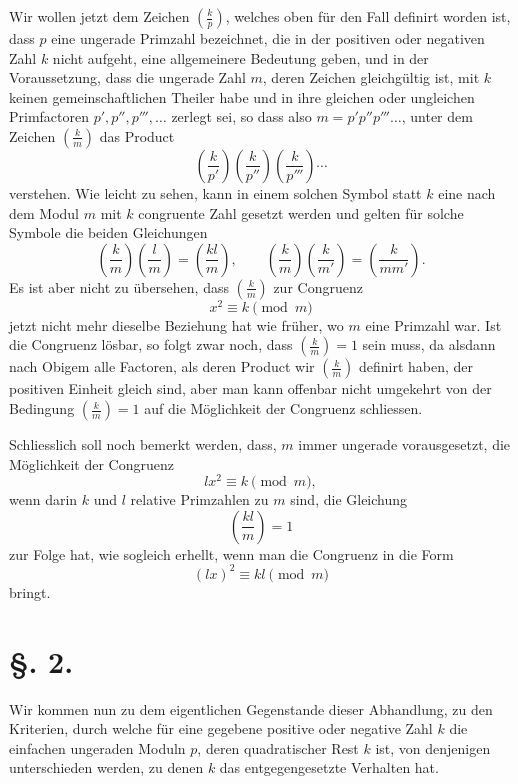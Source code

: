 \documentclass[11pt]{article}
\newcommand{\J}[2]{\left(\frac{#1}{#2}\right)}
\begin{document}
Wir wollen jetzt dem Zeichen $\J{k}{p}$, welches oben für den Fall definirt worden ist, dass $p$ eine ungerade Primzahl bezeichnet, die in der positiven oder negativen Zahl $k$ nicht aufgeht, eine allgemeinere Bedeutung geben, und in der Voraussetzung, dass die ungerade Zahl $m$, deren Zeichen gleichgültig ist, mit $k$ keinen gemeinschaftlichen Theiler habe und in ihre gleichen oder ungleichen Primfactoren $p',p'',p''',\ldots$ zerlegt sei, so dass also $m=p'p''p'''\ldots$, unter dem Zeichen $\J{k}{m}$ das Product
\[
 \J{k}{p'}\J{k}{p''}\J{k}{p'''}\cdots
\]
verstehen. Wie leicht zu sehen, kann in einem solchen Symbol statt $k$ eine nach dem Modul $m$ mit $k$ congruente Zahl gesetzt werden und gelten für solche Symbole die beiden Gleichungen
\[
 \J{k}{m}\J{l}{m}=\J{kl}{m},\qquad
 \J{k}{m}\J{k}{m'}=\J{k}{mm'}.
\]
Es ist aber nicht zu übersehen, dass $\J{k}{m}$ zur Congruenz
\[
 x^2\equiv k\pmod m
\]
jetzt nicht mehr dieselbe Beziehung hat wie früher, wo $m$ eine Primzahl war. Ist die Congruenz lösbar, so folgt zwar noch, dass $\J{k}{m}=1$ sein muss, da alsdann nach Obigem alle Factoren, als deren Product wir $\J{k}{m}$ definirt haben, der positiven Einheit gleich sind, aber man kann offenbar nicht umgekehrt von der Bedingung $\J{k}{m}=1$ auf die Möglichkeit der Congruenz schliessen.

Schliesslich soll noch bemerkt werden, dass, $m$ immer ungerade vorausgesetzt, die Möglichkeit der Congruenz
\[
 lx^2\equiv k\pmod m,
\]
wenn darin $k$ und $l$ relative Primzahlen zu $m$ sind, die Gleichung
\[
 \J{kl}{m}=1
\]
zur Folge hat, wie sogleich erhellt, wenn man die Congruenz in die Form
\[
 (lx)^2\equiv kl\pmod m
\]
bringt.

\section*{\S. 2.}

Wir kommen nun zu dem eigentlichen Gegenstande dieser Abhandlung, zu den Kriterien, durch welche für eine gegebene positive oder negative Zahl $k$ die einfachen ungeraden Moduln $p$, deren quadratischer Rest $k$ ist, von denjenigen unterschieden werden, zu denen $k$ das entgegengesetzte Verhalten hat.
\end{document}
